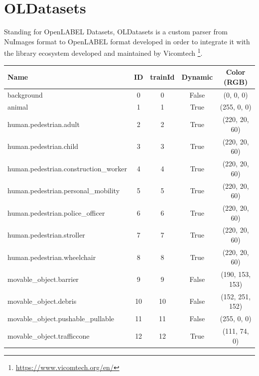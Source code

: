 \section{OLDatasets} \label{appendix:OLDatasets}

Standing for OpenLABEL Datasets, OLDatasets is a custom parser from NuImages format to OpenLABEL format developed in order to integrate it with the  library ecosystem developed and maintained by Vicomtech \footnote{\url{https://www.vicomtech.org/en/}}.

\begin{table}[h!]
    \centering
    \scriptsize
    \begin{tabular}{l c c c c}
        \toprule
        \textbf{Name} & \textbf{ID} & \textbf{trainId} & \textbf{Dynamic} & \textbf{Color (RGB)} \\
        \midrule
        background                          & 0  & 0  & False & (0, 0, 0) \\
        animal                              & 1  & 1  & True  & (255, 0, 0) \\
        human.pedestrian.adult              & 2  & 2  & True  & (220, 20, 60) \\
        human.pedestrian.child              & 3  & 3  & True  & (220, 20, 60) \\
        human.pedestrian.construction\_worker & 4  & 4  & True  & (220, 20, 60) \\
        human.pedestrian.personal\_mobility & 5  & 5  & True  & (220, 20, 60) \\
        human.pedestrian.police\_officer    & 6  & 6  & True  & (220, 20, 60) \\
        human.pedestrian.stroller           & 7  & 7  & True  & (220, 20, 60) \\
        human.pedestrian.wheelchair         & 8  & 8  & True  & (220, 20, 60) \\
        movable\_object.barrier             & 9  & 9  & False & (190, 153, 153) \\
        movable\_object.debris              & 10 & 10 & False & (152, 251, 152) \\
        movable\_object.pushable\_pullable  & 11 & 11 & False & (255, 0, 0) \\
        movable\_object.trafficcone         & 12 & 12 & True  & (111, 74, 0) \\

\end{tabular}
\end{table}
